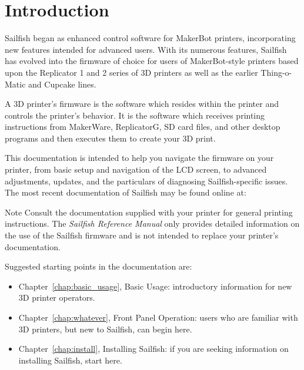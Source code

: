 \chapter{Introduction}

Sailfish began as enhanced control software for MakerBot printers,
incorporating new features intended for advanced users.  With its numerous
features, Sailfish has evolved into the firmware of choice for users of MakerBot-style printers based upon the Replicator 1 and 2 series
of 3D printers as well as the earlier Thing-o-Matic and Cupcake lines.

A 3D printer's firmware is the software which resides within the
printer and controls the printer's behavior. It is the software which
receives printing instructions from MakerWare, ReplicatorG, SD card
files, and other desktop programs and then executes them to create
your 3D print.

This documentation is intended to help you navigate the firmware on your printer, from basic setup and navigation of the \gls{LCD} screen, to advanced adjustments, updates, and the particulars of diagnosing Sailfish-specific issues.  The most recent documentation of Sailfish may be found online at:
\begin{quote}
\end{quote}

\begin{bclogo}[logo=\bcinfo, noborder=true, couleurBarre=yellow]{Note}
Consult the documentation supplied with your printer for general printing instructions.  The \emph{Sailfish Reference Manual} only provides detailed information on the use of the Sailfish \gls{firmware} and is not intended to replace your printer's documentation.  
\end{bclogo}

\pagebreak[4]

Suggested starting points in the documentation are:
\begin{itemize}
\item Chapter~\ref{chap:basic_usage}, Basic Usage: introductory information for new 3D printer operators.
\item Chapter~\ref{chap:whatever}, Front Panel Operation: users who are familiar with 3D printers, but new to Sailfish, can begin here.
\item Chapter~\ref{chap:install}, Installing Sailfish: if you are seeking information on installing Sailfish, start here.
\end{itemize}

